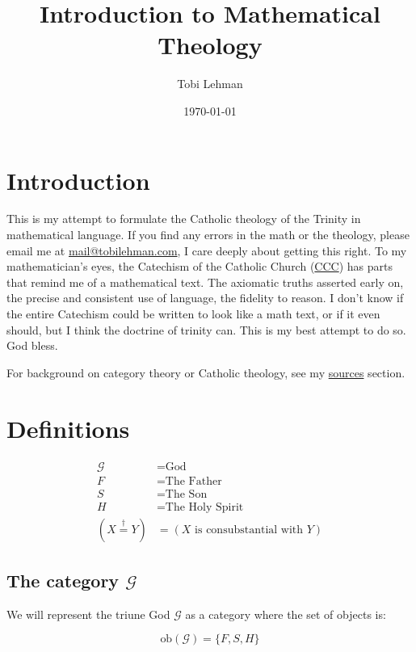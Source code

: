 \documentclass[11pt]{article}
\author{Tobi Lehman}
\date{\today}
\title{Introduction to Mathematical Theology}
\begin{document}
\maketitle
\tableofcontents

\section{Introduction}
\label{sec:introduction}

This is my attempt to formulate the Catholic theology of the Trinity in mathematical language. If you find any errors in the math or the theology, please email me at \href{mailto:mail@tobilehman.com}{mail@tobilehman.com}, I care deeply about getting this right. To my mathematician's eyes, the Catechism of the Catholic Church (\href{https://www.vatican.va/archive/ENG0015/_INDEX.HTM}{CCC}) has parts that remind me of a mathematical text. The axiomatic truths asserted early on, the precise and consistent use of language, the fidelity to reason. I don't know if the entire Catechism could be written to look like a math text, or if it even should, but I think the doctrine of trinity can. This is my best attempt to do so. God bless.

For background on category theory or Catholic theology, see my \hyperref[sec:sources]{sources} section.

\section{Definitions}
\label{sec:definitions}

\begin{align}
\mathcal{G} &= \text{God} \\
F &= \text{The Father}\\
S &= \text{The Son} \\
H &= \text{The Holy Spirit} \\
(X \stackrel{\dagger}{=} Y) &= (X \text{ is consubstantial with } Y)
\end{align}

\subsection{The category $\mathcal{G}$}
\label{sec:category-g}

We will represent the triune God $\mathcal{G}$ as a category where the set of objects is:

$$\text{ob}(\mathcal{G}) = \{F,S,H\}$$
\end{document}
